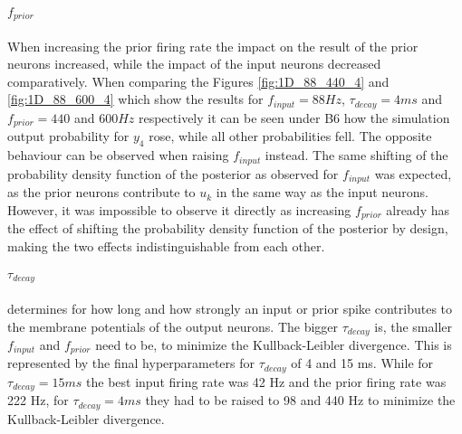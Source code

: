 \paragraph{$f_{prior}$} When increasing the prior firing rate the impact on the result of the prior neurons increased, while the impact of the input neurons decreased comparatively. When comparing the Figures \ref{fig:1D_88_440_4} and \ref{fig:1D_88_600_4} which show the results for $f_{input} = 88 Hz$, $\tau_{decay} = 4 ms$ and $f_{prior} = 440$ and $600 Hz$ respectively it can be seen under B6 how the simulation output probability for $y_4$ rose, while all other probabilities fell. The opposite behaviour can be observed when raising $f_{input}$ instead. The same shifting of the probability density function of the posterior as observed for $f_{input}$ was expected, as the prior neurons contribute to $u_k$ in the same way as the input neurons. However, it was impossible to observe it directly as increasing $f_{prior}$ already has the effect of shifting the probability density function of the posterior by design, making the two effects indistinguishable from each other.

\paragraph{$\tau_{decay}$} determines for how long and how strongly an input or prior spike contributes to the membrane potentials of the output neurons. The bigger $\tau_{decay}$ is, the smaller $f_{input}$ and $f_{prior}$ need to be, to minimize the Kullback-Leibler divergence. This is represented by the final hyperparameters for $\tau_{decay}$ of 4 and 15 ms. While for $\tau_{decay} = 15 ms$ the best input firing rate was 42 Hz and the prior firing rate was 222 Hz, for $\tau_{decay} = 4 ms$ they had to be raised to 98 and 440 Hz to minimize the Kullback-Leibler divergence.

